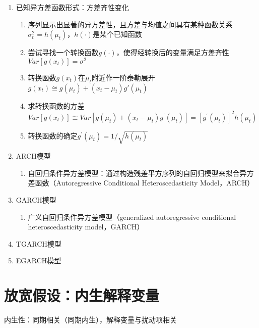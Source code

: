 \documentclass[12pt]{book}
\begin{document}
\begin{enumerate}[1.]
    \item 已知异方差函数形式：方差齐性变化
          \begin{enumerate}[(1)]
              \item 序列显示出显著的异方差性，且方差与均值之间具有某种函数关系$σ_t^2=h(\mu_t)$，$h(⋅)$是某个已知函数
              \item 尝试寻找一个转换函数$g(⋅)$，使得经转换后的变量满足方差齐性$Var[g(x_t)]=\sigma^2$
              \item 转换函数$g(x_t)$在$\mu_t$附近作一阶泰勒展开 $g(x_{t})\cong g(\mu_t)+(x_{t} - \mu_{t} ) g' (\mu_t)$
              \item 求转换函数的方差  $Var[g(x_t)]\cong Var[g(\mu_t)+(x_t-\mu_t)g^{'} (\mu_t)]=[g^{'} (\mu_t)]^2 h(\mu_t)$
              \item 转换函数的确定$g^{'} (\mu_t)=1/\sqrt{h(\mu_t)}$
          \end{enumerate}
    \item ARCH模型
          \begin{enumerate}[(1)]
              \item 自回归条件异方差模型：通过构造残差平方序列的自回归模型来拟合异方差函数（Autoregressive Conditional Heteroscedasticity Model，ARCH）
          \end{enumerate}
    \item GARCH模型
          \begin{enumerate}[(1)]
              \item 广义自回归条件异方差模型（generalized autoregressive conditional heteroscedasticity model，GARCH）
          \end{enumerate}
    \item TGARCH模型
    \item EGARCH模型
\end{enumerate}










\section{放宽假设：内生解释变量}








内生性：同期相关（同期内生），解释变量与扰动项相关
\end{document}
